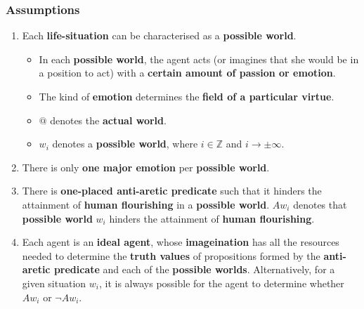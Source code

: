 \documentclass[11pt]{article}
\begin{document}
\subsubsection{Assumptions}
\label{sec:org707f89b}
\begin{enumerate}
\item Each \textbf{life-situation} can be characterised as a \textbf{possible world}.
\begin{itemize}
\item In each \textbf{possible world}, the agent acts (or imagines that she would be in a position to act) with a \textbf{certain amount of passion or emotion}.
\item The kind of \textbf{emotion} determines the \textbf{field of a particular virtue}.
\item \(@\) denotes the \textbf{actual world}.
\item \(w_i\) denotes a \textbf{possible world}, where \(i \in \mathbb{Z}\) and \(i \rightarrow \pm \infty\).
\end{itemize}
\item There is only \textbf{one major emotion} per \textbf{possible world}.
\item There is \textbf{one-placed anti-aretic predicate} such that it hinders the attainment of \textbf{human flourishing} in a \textbf{possible world}.
\(Aw_i\) denotes that \textbf{possible world} \(w_i\) hinders the attainment of \textbf{human flourishing}.
\item Each agent is an \textbf{ideal agent}, whose \textbf{imageination} has all the resources needed to determine the \textbf{truth values} of propositions formed by the \textbf{anti-aretic predicate} and each of the \textbf{possible worlds}.
Alternatively, for a given situation \(w_i\), it is always possible for the agent to determine whether \(Aw_i\) or \(\neg Aw_i\).
\end{enumerate}

 \newpage
\end{document}
